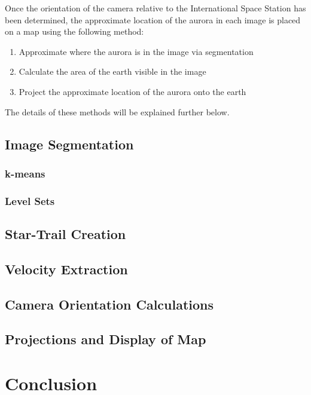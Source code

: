 \documentclass[12pt]{article}
\theoremstyle{definition}
\begin{document}
Once the orientation of the camera relative to the International Space Station has been determined, the approximate location of the aurora in each image is placed on a map using the following method:
\begin{enumerate}
\item Approximate where the aurora is in the image via segmentation
\item Calculate the area of the earth visible in the image
\item Project the approximate location of the aurora onto the earth
\end{enumerate}

The details of these methods will be explained further below. 

\subsection{ \bf Image Segmentation }

\subsubsection{ \bf k-means }

\subsubsection{ \bf Level Sets }


\subsection{ \bf Star-Trail Creation }

\subsection{ \bf Velocity Extraction }

\subsection{ \bf Camera Orientation Calculations }

\subsection{ \bf Projections and Display of Map }

\section{ \bf Conclusion }
\end{document}
